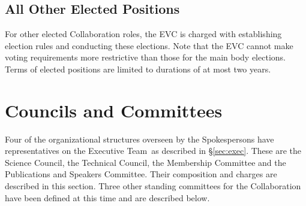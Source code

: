 \documentclass[12pt]{article}
\newcommand{\exec}{{Executive Team}}
\begin{document}


\subsection{All Other Elected Positions}
For other elected Collaboration roles, the EVC is charged with establishing election rules and conducting these elections. Note that the EVC cannot make voting requirements more restrictive than those for the main body elections. Terms of elected positions are limited to durations of at most two years. 

\section{Councils and Committees}
\label{sec:councils}
Four of the organizational structures overseen by the Spokespersons have representatives on the \exec\ as described in 
\S\ref{sec:exec}.  These are the Science Council, the Technical Council, the Membership Committee and the Publications and Speakers Committee.  Their composition and charges are described in this section.  Three other standing committees for the Collaboration have been defined at this time and are described below.  
\end{document}
